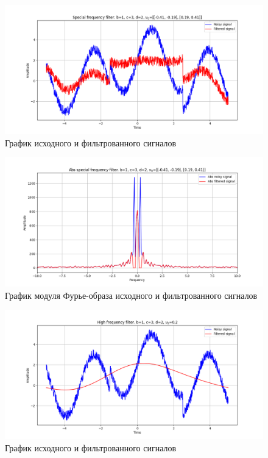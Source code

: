 \documentclass[a4paper, 12pt]{article}
\begin{document}
    \begin{figure}[!htb]
        \centering
        \includegraphics[scale=0.485]{4_u_flt_u_nospec_v2.png}
        \captionsetup{skip=0pt}
        \caption{График исходного и фильтрованного сигналов}
        \label{fig:fig87}
    \end{figure}
    \begin{figure}[!htb]
        \centering
        \includegraphics[scale=0.485]{4_abs_u_U_nospec_v2.png}
        \captionsetup{skip=0pt}
        \caption{График модуля Фурье-образа исходного и фильтрованного сигналов}
        \label{fig:fig88}
    \end{figure}
    \begin{figure}[!htb]
        \centering
        \includegraphics[scale=0.485]{4_u_flt_u_nospec_v3.png}
        \captionsetup{skip=0pt}
        \caption{График исходного и фильтрованного сигналов}
        \label{fig:fig89}
    \end{figure}
\end{document}
